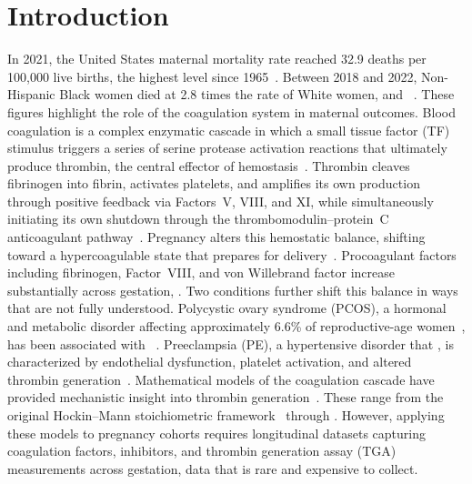 \section{Introduction}
\label{sec:intro}

In 2021, the United States maternal mortality rate reached 32.9 deaths per 100,000
live births, the highest level since 1965~\citep{Toy2023WSJ,Harris2023}. Between 2018 and 2022,
Non-Hispanic Black women died at 2.8 times the rate of White women, and
~\citep{Chen2025}. These figures
highlight the role of the coagulation system in maternal outcomes. Blood coagulation is a complex enzymatic cascade in which a small
tissue factor (TF) stimulus triggers a series of serine protease activation reactions
that ultimately produce thrombin, the central effector of
hemostasis~\citep{Mann2011,Butenas2009}. Thrombin cleaves fibrinogen into fibrin,
activates platelets, and amplifies its own production through positive feedback via
Factors~V, VIII, and XI, while simultaneously initiating its own shutdown through the
thrombomodulin--protein~C anticoagulant pathway~. Pregnancy
alters this hemostatic balance, shifting toward a hypercoagulable state
that prepares for delivery~\citep{Hellgren2003,Grouzi2022,Bremme2003}.
Procoagulant factors including fibrinogen, Factor~VIII, and von Willebrand factor
increase substantially across gestation, . Two conditions further shift this balance in ways that are not fully understood.
Polycystic ovary syndrome (PCOS), a hormonal and metabolic disorder affecting
approximately 6.6\% of reproductive-age women~\citep{Azziz2004}, has been associated with
~\citep{Palomba2015}. Preeclampsia (PE), a hypertensive
disorder that , is
characterized by endothelial dysfunction, platelet activation, and altered thrombin
generation~\citep{Dusse2011}. Mathematical models of the coagulation cascade have provided mechanistic insight
into thrombin generation~\citep{Luan2007,Luan2010}. These range
from the original Hockin--Mann stoichiometric framework~\citep{Hockin2002} through
. However, applying these models to pregnancy
cohorts requires longitudinal datasets capturing coagulation factors, inhibitors,
and thrombin generation assay (TGA) measurements across gestation, data that is
rare and expensive to collect.


